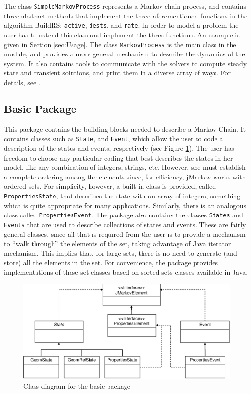 \documentclass[11pt,letterpaper]{article}
\newcommand{\Active}{\texttt{active}\xspace}
\newcommand{\Rate}{\texttt{rate}\xspace}
\newcommand{\Dests}{\texttt{dests}\xspace}
\newcommand\SimpleMarkovProcess{\texttt{Simple\-Markov\-Pro\-cess}\xspace}
\newcommand\MarkovProcess{\texttt{Markov\-Pro\-cess}\xspace}
\begin{document}
The class \SimpleMarkovProcess represents a Markov cha\-in process, and contains
three abstract methods that implement the three aforementioned functions in the
algorithm BuildRS: \Active, \Dests, and \Rate.  In order to model a problem the
user has to extend this class and implement the three functions.  An example is
given in Section \ref{sec:Usage}.  The class \MarkovProcess is the main class in
the module, and provides a more general mechanism to describe the dynamics of
the system.  It also contains tools to communicate with the solvers to compute
steady state and transient solutions, and print them in a diverse array of ways.
For details, see \cite{rian.goez:jmarkovManual}.

\subsection{Basic Package}\label{sc:BasicModule}

This package contains the building blocks needed to describe a Markov Chain.  It
contains classes such as \texttt{State}, and \texttt{Event}, which allow the
user to code a description of the states and events, respectively (see Figure
\ref{fg:basicModuleDiag}).  The user has freedom to choose any particular coding
that best describes the states in her model, like any combination of integers,
strings, etc.  However, she must establish a complete ordering among the
elements since, for efficiency, jMarkov works with ordered sets.  For
simplicity, however, a built-in class is provided, called
\texttt{PropertiesState}, that describes the state with an array of integers,
something which is quite appropriate for many applications.  Similarly, there is
an analogous class called \texttt{PropertiesEvent}.  The package also contains
the classes \texttt{States} and \texttt{Events} that are used to describe
collections of states and events.  These are fairly general classes, since all
that is required from the user is to provide a mechanism to ``walk through'' the
elements of the set, taking advantage of Java iterator mechanism.  This implies
that, for large sets, there is no need to generate (and store) all the elements
in the set.  For convenience, the package provides implementations of these set
classes based on sorted sets classes available in Java.

\begin{figure}[htb]
    \centering
  \includegraphics[width=0.95\columnwidth]{pics/basicModuleDiag}
  \caption{Class diagram for the basic package}\label{fg:basicModuleDiag}
\end{figure}
\end{document}
